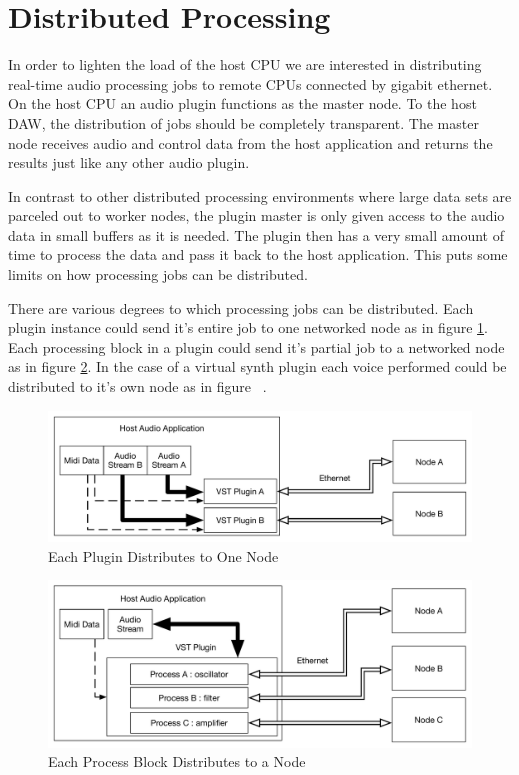 \section{Distributed Processing}

In order to lighten the load of the host CPU we are interested in distributing real-time audio processing jobs to remote CPUs connected by gigabit ethernet. On the host CPU an audio plugin functions as the master node. To the host DAW, the distribution of jobs should be completely transparent. The master node receives audio and control data from the host application and returns the results just like any other audio plugin.

In contrast to other distributed processing environments where large data sets are parceled out to worker nodes, the plugin master is only given access to the audio data in small buffers as it is needed. The plugin then has a very small amount of time to process the data and pass it back to the host application. This puts some limits on how processing jobs can be distributed.

There are various degrees to which processing jobs can be distributed. Each plugin instance could send it's entire job to one networked node as in figure \ref{fig:one_to_one}. Each processing block in a plugin could send it's partial job to a networked node as in figure \ref{fig:perproccessor}. In the case of a virtual synth plugin each voice performed could be distributed to it's own node as in figure ~.

\begin{figure}[H]
    \centering
    \includegraphics[width=\textwidth]{assets/distribution_1to1.pdf}
    \caption{Each Plugin Distributes to One Node}
    \label{fig:one_to_one}
\end{figure}

\begin{figure}[H]
    \centering
    \includegraphics[width=\textwidth]{assets/distribution_perprocessor.pdf}
    \caption{Each Process Block Distributes to a Node}
    \label{fig:perproccessor}
\end{figure}

